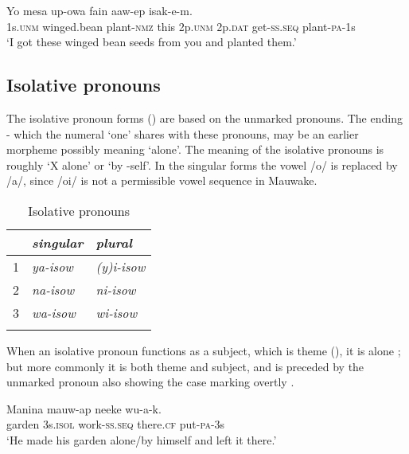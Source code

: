 \ea%
\label{ex:3:x596}
\gll Yo mesa up-owa fain   aaw-ep isak-e-m.\\
1s.\textsc{unm} winged.bean plant-\textsc{nmz} this 2p.\textsc{unm} 2p.\textsc{dat} get-\textsc{ss}.\textsc{seq} plant-\textsc{pa}-1s\\
\glt`I got these winged bean seeds from you and planted them.'
\z

\subsection{Isolative pronouns}
{}
The isolative pronoun forms () are based on the unmarked pronouns. The ending \nobreakdash-\textstyleStyleVernacularWordsItalic{,} which the numeral  `one' shares with these pronouns, may be an earlier morpheme possibly meaning `alone'. The meaning of the isolative pronouns is roughly `X alone' or `by -self'. In the singular forms the vowel /o/ is replaced by /a/, since /oi/ is not a permissible vowel sequence in Mauwake. 

\begin{table}
\caption{Isolative pronouns}
\label{tab:3:isolativepron}
 
\begin{tabular}{l>{\itshape}l>{\itshape}l}
\mytoprule
&\upshape singular &\upshape plural\\
\midrule
1 &ya-isow &(y)i-isow\\
2 &na-isow &ni-isow\\
3 &wa-isow &wi-isow\\
\mybottomrule
\end{tabular}
\end{table}


When an isolative pronoun functions as a subject, which is  theme (), it is alone ; but more commonly it is both theme and subject, and is preceded by the unmarked pronoun also showing the case marking overtly . 

\ea%
\label{ex:3:x599}
\gll Manina  mauw-ap neeke wu-a-k. \\
garden 3s.\textsc{isol} work-\textsc{ss}.\textsc{seq} there.\textsc{cf} put-\textsc{pa}-3s\\
\glt`He made his garden alone/by himself and left it there.'
\z

